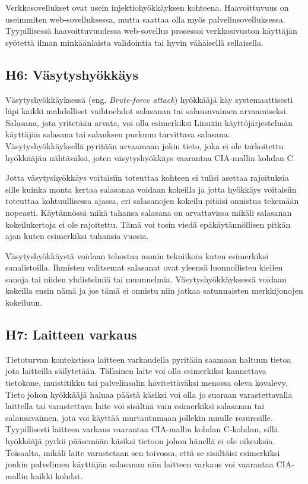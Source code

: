 Verkkosovellukset ovat usein injektiohyökkäyksen kohteena. Haavoittuvuus on useimmiten web-sovelluksessa, mutta saattaa olla myös palvelinsovelluksessa. Tyypillisessä haavoittuvuudessa web-sovellus prosessoi verkkosivuston käyttäjän syötettä ilman minkäänlaista validointia tai hyvin vähäisellä sellaisella.~\cite{mcdonald2020web}

\subsection{H6: Väsytyshyökkäys}
Väsytyshyökkäyksessä (eng. \textit{Brute-force attack}) hyökkääjä käy systemaattisesti läpi kaikki mahdolliset vaihtoehdot salasanan tai salausavaimen arvaamiseksi. Salasana, jota yritetään arvata, voi olla esimerkiksi Linuxin käyttöjärjestelmän käyttäjän salasana tai salauksen purkuun tarvittava salasana. Väsytyshyökkäyksellä pyritään arvaamaan jokin tieto, joka ei ole tarkoitettu hyökkääjän nähtäväksi, joten väsytyshyökkäys vaarantaa CIA-mallin kohdan C.

Jotta väsytyshyökkäys voitaisiin toteuttaa kohteen ei tulisi asettaa rajoituksia sille kuinka monta kertaa salasanaa voidaan kokeilla ja jotta hyökkäys voitaisiin toteuttaa kohtuullisessa ajassa, eri salasanojen kokeilu pitäisi onnistua tekemään nopeasti. Käytännössä mikä tahansa salasana on arvattavissa mikäli salasanan kokeilukertoja ei ole rajoitettu. Tämä voi tosin viedä epäkäytännöllisen pitkän ajan kuten esimerkiksi tuhansia vuosia.

Väsytyshyökkäystä voidaan tehostaa monin tekniikoin kuten esimerkiksi sanalistoilla. Ihmisten valitsemat salasanat ovat yleensä luonnollisten kielien sanoja tai niiden yhdistelmiä tai muunnelmia. Väsytyshyökkäyksessä voidaan kokeilla ensin nämä ja jos tämä ei onnistu niin jatkaa satunnaisten merkkijonojen kokeiluun.~\cite{beaver2015hacking}

\subsection{H7: Laitteen varkaus}
Tietoturvan kontekstissa laitteen varkaudella pyritään saamaan haltuun tietoa jota laitteilla säilytetään. Tällainen laite voi olla esimerkiksi kannettava tietokone, muistitikku tai palvelinsalin hävitettäväksi menossa oleva kovalevy. Tieto johon hyökkääjä haluaa päästä käsiksi voi olla jo suoraan varastettavalla laittella tai varastettava laite voi sisältää vain esimerkiksi salasanan tai salausavaimen, jota voi käyttää murtautumaan jollekin muulle resurssille. Tyypillisesti laitteen varkaus vaarantaa CIA-mallin kohdan C-kohdan, sillä hyökkääjä pyrkii pääsemään käsiksi tietoon johon hänellä ei ole oikeuksia. Toisaalta, mikäli laite varastetaan sen toivossa, että se sisältäisi esimerkiksi jonkin palvelimen käyttäjän salasanan niin laitteen varkaus voi vaarantaa CIA-mallin kaikki kohdat.~\cite{beaver2015hacking}
